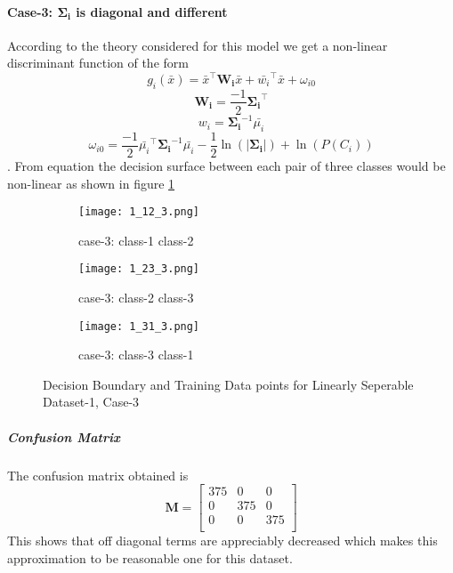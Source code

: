 \documentclass[a4paper]{article}
\begin{document}
\paragraph{Case-3: $\mathbf{\Sigma_{i}}$ is diagonal and different}
According to the theory considered for this model we get a non-linear discriminant function of the form
\begin{equation}\label{eq:non-linear}
g_{i}(\bar{x}) = \bar{x}^{\intercal}\mathbf{W_{i}}\bar{x}+\bar{w_{i}}^{\intercal}\bar{x}+\omega_{i0}
\end{equation}
\[
\mathbf{W_{i}} = \frac{-1}{2}\mathbf{\Sigma_{i}}^{\intercal}
\]
\[
w_{i} = \mathbf{\Sigma_{i}}^{-1}\bar{\mu_{i}}
\]
\[
\omega_{i0} = \frac{-1}{2}\bar{\mu_{i}}^{\intercal}\mathbf{\Sigma_{i}}^{-1}\bar{\mu_{i}}-\frac{1}{2}\ln(\left|\mathbf{\Sigma_{i}}\right|)+\ln(P(C_{i}))
\]. From equation the decision surface between each pair of three classes would be non-linear as shown in figure \ref{fig:1_3}
\begin{figure}[h!]
  \centering
  \begin{subfigure}[b]{0.4\linewidth}
    \texttt{[image: 1\_12\_3.png]}
     \caption{case-3: class-1 class-2}
  \end{subfigure}
  \begin{subfigure}[b]{0.4\linewidth}
    \texttt{[image: 1\_23\_3.png]}
    \caption{case-3: class-2 class-3}
  \end{subfigure}
  \begin{subfigure}[b]{0.4\linewidth}
    \texttt{[image: 1\_31\_3.png]}
    \caption{case-3: class-3 class-1}
  \end{subfigure}
  \caption{Decision Boundary and Training Data points for Linearly Seperable Dataset-1, Case-3}
  \label{fig:1_3}
\end{figure}
\subparagraph{Confusion Matrix}
The confusion matrix obtained is
\[
\mathbf{M} = \left[ {\begin{array}{ccc}
375 & 0 & 0\\
0 & 375 & 0\\
0 & 0 & 375\\
\end{array}} \right]
\]This shows that off diagonal terms are appreciably decreased which makes this approximation to be reasonable one for this dataset.
\end{document}
